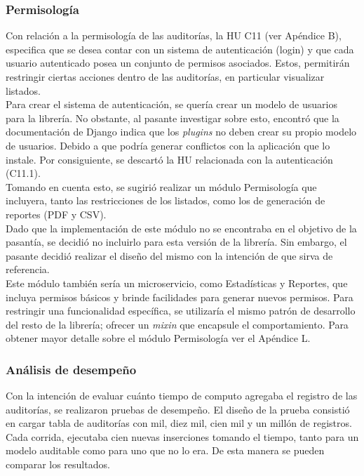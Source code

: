 \subsubsection{Permisología}

Con relación a la permisología de las auditorías, la HU C11 (ver Apéndice B), especifica que se desea contar con un sistema de autenticación (login) y que cada usuario autenticado posea un conjunto de permisos asociados. Estos, permitirán restringir ciertas acciones dentro de las auditorías, en particular visualizar listados. \\

Para crear el sistema de autenticación, se quería crear un modelo de usuarios para la librería. No obstante, al pasante investigar sobre esto, encontró que la documentación de Django indica que los \textit{plugins} no deben crear su propio modelo de usuarios. Debido a que podría generar conflictos con la aplicación que lo instale. Por consiguiente, se descartó la HU relacionada con la autenticación (C11.1). \\

Tomando en cuenta esto, se sugirió realizar un módulo Permisología que incluyera, tanto las restricciones de los listados, como los de generación de reportes (PDF y CSV).\\

Dado que la implementación de este módulo no se encontraba en el objetivo de la pasantía, se decidió no incluirlo para esta versión de la librería. Sin embargo, el pasante decidió realizar el diseño del mismo con la intención de que sirva de referencia. \\

Este módulo también sería un microservicio, como Estadísticas y Reportes, que incluya permisos básicos y brinde facilidades para generar nuevos permisos. Para restringir una funcionalidad específica, se utilizaría el mismo patrón de desarrollo del resto de la librería; ofrecer un \textit{mixin} que encapsule el comportamiento. Para obtener mayor detalle sobre el módulo Permisología ver el Apéndice L.

\subsubsection{Análisis de desempeño}

Con la intención de evaluar cuánto tiempo de computo agregaba el registro de las auditorías, se realizaron pruebas de desempeño. El diseño de la prueba consistió en cargar tabla de auditorías con mil, diez mil, cien mil y un millón de registros. Cada corrida, ejecutaba cien nuevas inserciones tomando el tiempo, tanto para un modelo auditable como para uno que no lo era. De esta manera se pueden comparar los resultados.\\

